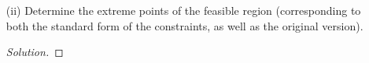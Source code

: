 \documentclass[12pt]{article}
\makeatletter
\theoremstyle{homework}
\newenvironment{exercise}[1]
{\def\@currentlabel{#1}\exercisecore}
{\endexercisecore}
\makeatother
\begin{document}
\begin{exercise}{3.1}
\begin{enumerate}
\begin{proof}[Solution]
      Therefore solutions to this equation with respect to our free slack variables are of the form,
      \begin{equation*}
        x = \begin{pmatrix}
          40\\
          40\\
          -20\\
          0\\
          0
        \end{pmatrix}
        +
        s_2
        \begin{pmatrix}
          0\\
          -1\\
          1\\
          1\\
          0
        \end{pmatrix}
        +
        s_3
        \begin{pmatrix}
          -1\\
          1\\
          1\\
          0\\
          1
        \end{pmatrix}
      \end{equation*}
      We say that non-negative solutions are feasible and negative solutions are infeasible. 
    \end{proof}
    \vspace{.15in}
    
    \item[(ii)] Determine the extreme points of the feasible region (corresponding to both the 
    standard form of the constraints, as well as the original version). 
    \begin{proof}[Solution]
      
    \end{proof}
  \end{enumerate}
  
\end{exercise}
\vspace{.5in}
\end{document}
